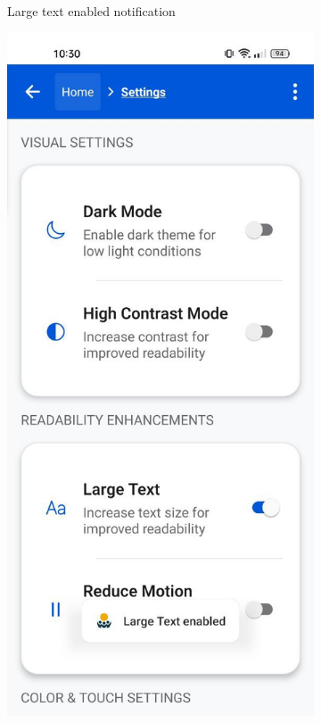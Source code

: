 \begin{enumerate}
\begin{figure}[ht]
\begin{subfigure}[b]{0.48\textwidth}
        \caption{Large text enabled notification}
        \label{fig:settings-text-notification}
    \end{subfigure}
    \hfill
    \begin{subfigure}[b]{0.48\textwidth}
        \centering
        \includegraphics[width=\linewidth, alt={Settings screen with color filter enabled notification}]{img/settings2.jpg}

\end{subfigure}
\end{figure}
\end{enumerate}

